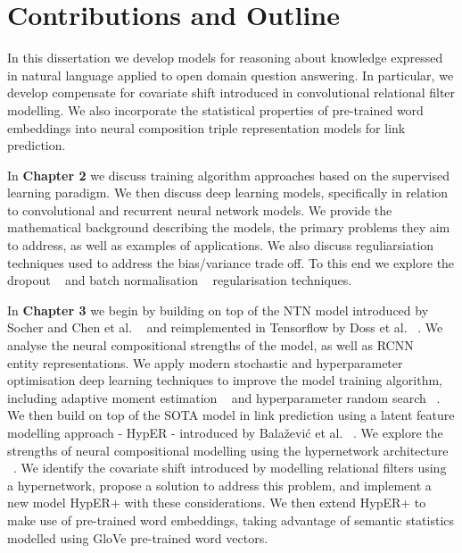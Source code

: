 
\section{Contributions and Outline} %

\noindent In this dissertation we develop models for reasoning about knowledge expressed in natural language applied to open domain question answering. In particular, we develop compensate for covariate shift introduced in convolutional relational filter modelling. We also incorporate the statistical properties of pre-trained word embeddings into neural composition triple representation models for link prediction. \par

\noindent In \textbf{Chapter 2} we discuss training algorithm approaches based on the supervised learning paradigm. We then discuss deep learning models, specifically in relation to convolutional and recurrent neural network models. We provide the mathematical background describing the models, the primary problems they aim to address, as well as examples of applications. We also discuss reguliarsiation techniques used to address the bias/variance trade off. To this end we explore the dropout \unskip ~\citep{srivastava2014dropout} and batch normalisation \unskip ~\citep{ioffe2015batch} regularisation techniques. \par

\noindent In \textbf{Chapter 3} we begin by building on top of the NTN model introduced by Socher and Chen et al. \unskip ~\citep{socher2013reasoning} and reimplemented in Tensorflow by Doss et al. \unskip ~\citep{Doss2015}. We analyse the neural compositional strengths of the model, as well as RCNN \unskip ~\citep{socher2012semantic} entity representations.  We apply modern stochastic and hyperparameter optimisation deep learning techniques to improve the model training algorithm, including adaptive moment estimation ~\citep{kingma2014adam} and hyperparameter random search \unskip ~\citep{bergstra2012random}. We then build on top of the SOTA model in link prediction using a latent feature modelling approach - HypER - introduced by Bala\v{z}evi\'c et al. \unskip ~\citep{balazevic2019hypernetwork}. We explore the strengths of neural compositional modelling using the hypernetwork architecture \unskip ~\citep{ha2016hypernetworks}. We identify the covariate shift introduced by modelling relational filters using a hypernetwork, propose a solution to address this problem, and implement a new model HypER+ with these considerations. We then extend HypER+ to make use of pre-trained word embeddings, taking advantage of semantic statistics modelled using GloVe pre-trained word vectors. \par

